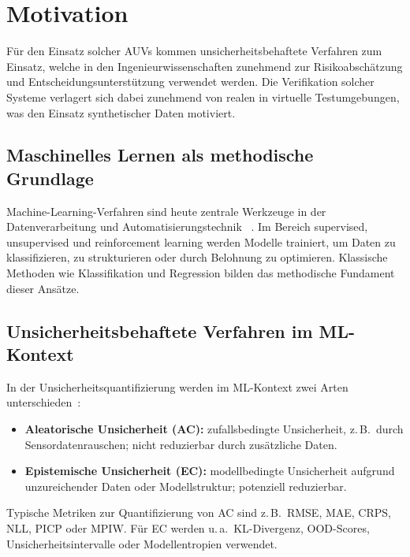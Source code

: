 
\chapter{Motivation}
\label{chapter:motivation}

Für den Einsatz solcher AUVs kommen unsicherheitsbehaftete Verfahren zum Einsatz, welche in den Ingenieurwissenschaften zunehmend zur Risikoabschätzung und Entscheidungsunterstützung verwendet werden. Die Verifikation solcher Systeme verlagert sich dabei zunehmend von realen in virtuelle Testumgebungen, was den Einsatz synthetischer Daten motiviert.

\section{Maschinelles Lernen als methodische Grundlage}

Machine-Learning-Verfahren sind heute zentrale Werkzeuge in der Datenverarbeitung und Automatisierungstechnik ~\parencite{nof2023}. Im Bereich supervised, unsupervised und reinforcement learning werden Modelle trainiert, um Daten zu klassifizieren, zu strukturieren oder durch Belohnung zu optimieren. Klassische Methoden wie Klassifikation und Regression bilden das methodische Fundament dieser Ansätze.

\section{Unsicherheitsbehaftete Verfahren im ML-Kontext}

In der Unsicherheitsquantifizierung werden im ML-Kontext zwei Arten unterschieden~\parencite{Hullermeier2021}:

\begin{itemize}
  \item \textbf{Aleatorische Unsicherheit (AC):} zufallsbedingte Unsicherheit, z.\,B.\ durch Sensordatenrauschen; nicht reduzierbar durch zusätzliche Daten.
  \item \textbf{Epistemische Unsicherheit (EC):} modellbedingte Unsicherheit aufgrund unzureichender Daten oder Modellstruktur; potenziell reduzierbar.
\end{itemize}

\noindent
Typische Metriken zur Quantifizierung von AC sind z.\,B.\ RMSE, MAE, CRPS, NLL, PICP oder MPIW. Für EC werden u.\,a.\ KL-Divergenz, OOD-Scores, Unsicherheitsintervalle oder Modellentropien verwendet.

